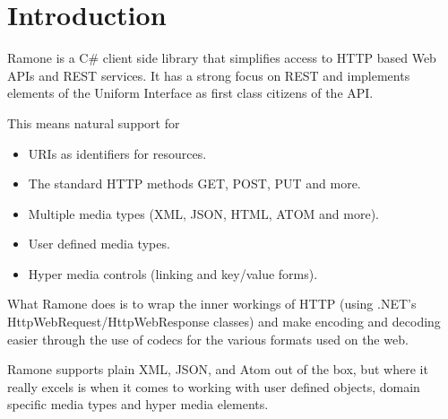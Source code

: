 \chapter{Introduction}

Ramone is a C\# client side library that simplifies access to HTTP based Web APIs 
and REST services. It has a strong focus on REST and implements elements of the 
Uniform Interface as first class citizens of the API.

This means natural support for

\begin{itemize}

\item URIs as identifiers for resources.
\item The standard HTTP methods GET, POST, PUT and more.
\item Multiple media types (XML, JSON, HTML, ATOM and more).
\item User defined media types.
\item Hyper media controls (linking and key/value forms).

\end{itemize}

What Ramone does is to wrap the inner workings of HTTP (using .NET's 
HttpWebRequest/HttpWebResponse classes) and make encoding and decoding easier 
through the use of codecs for the various formats used on the web.

Ramone supports plain XML, JSON, and Atom out of the box, but where it really
excels is when it comes to working with user defined objects, domain specific
media types and hyper media elements.
